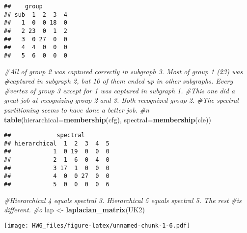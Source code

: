\documentclass[
]{article}
\newenvironment{Shaded}{\begin{snugshade}}{\end{snugshade}}
\newcommand{\CommentTok}[1]{\textcolor[rgb]{0.56,0.35,0.01}{\textit{#1}}}
\newcommand{\DataTypeTok}[1]{\textcolor[rgb]{0.13,0.29,0.53}{#1}}
\newcommand{\DecValTok}[1]{\textcolor[rgb]{0.00,0.00,0.81}{#1}}
\newcommand{\KeywordTok}[1]{\textcolor[rgb]{0.13,0.29,0.53}{\textbf{#1}}}
\newcommand{\NormalTok}[1]{#1}
\newcommand{\OperatorTok}[1]{\textcolor[rgb]{0.81,0.36,0.00}{\textbf{#1}}}
\newcommand{\StringTok}[1]{\textcolor[rgb]{0.31,0.60,0.02}{#1}}
\begin{document}
\begin{verbatim}
##    group
## sub  1  2  3  4
##   1  0  0 18  0
##   2 23  0  1  2
##   3  0 27  0  0
##   4  4  0  0  0
##   5  6  0  0  0
\end{verbatim}

\begin{Shaded}
\begin{Highlighting}[]
\CommentTok{#All of group 2 was captured correctly in subgraph 3. Most of group 1 (23) was}
\CommentTok{#captured in subgraph 2, but 10 of them ended up in other subgraphs. Every}
\CommentTok{#vertex of group 3 except for 1 was captured in subgraph 1.}
\CommentTok{#This one did a great job at recognizing group 2 and 3. Both recognized group 2.}
\CommentTok{#The spectral partitioning seems to have done a better job.}
\CommentTok{#n}
\KeywordTok{table}\NormalTok{(}\DataTypeTok{hierarchical=}\KeywordTok{membership}\NormalTok{(cfg), }\DataTypeTok{spectral=}\KeywordTok{membership}\NormalTok{(cle))}
\end{Highlighting}
\end{Shaded}

\begin{verbatim}
##             spectral
## hierarchical  1  2  3  4  5
##            1  0 19  0  0  0
##            2  1  6  0  4  0
##            3 17  1  0  0  0
##            4  0  0 27  0  0
##            5  0  0  0  0  6
\end{verbatim}

\begin{Shaded}
\begin{Highlighting}[]
\CommentTok{#Hierarchical 4 equals spectral 3. Hierarchical 5 equals spectral 5. The rest}
\CommentTok{#is different.}
\CommentTok{#o}
\NormalTok{lap <-}\StringTok{ }\KeywordTok{laplacian_matrix}\NormalTok{(UK2)}
\end{Highlighting}
\end{Shaded}

\texttt{[image: HW6\_files/figure-latex/unnamed-chunk-1-6.pdf]}

\begin{Shaded}
\end{Shaded}
\end{document}
